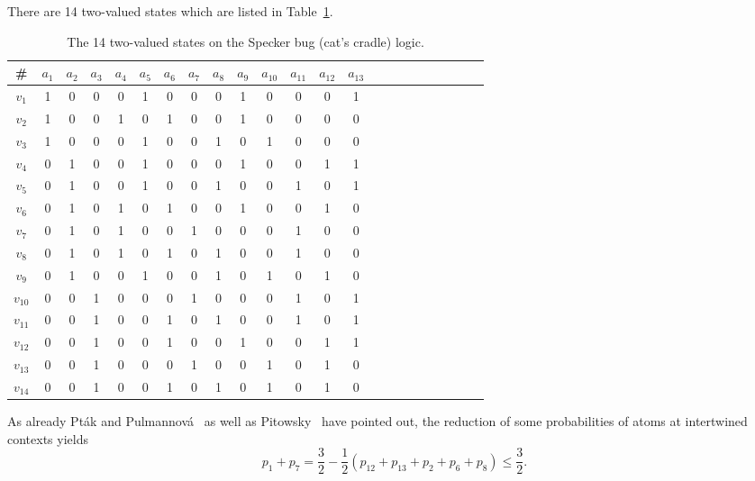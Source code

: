 There are 14 two-valued  states which are listed in Table~\ref{2001-cesena-t2}.
 \begin{table}%
 \begin{center}
\caption{\label{2001-cesena-t2}  The 14 two-valued states on the Specker bug (cat's cradle) logic.}
 \begin{tabular}{ccccccccccccccccccccccc}
\hline\hline
\# &$a_1$&$a_2$&$a_3$&$a_4$&$a_5$&$a_6$&$a_7$&$a_8$&$a_9$&$a_{10}$&$a_{11}$&$a_{12}$&$a_{13}$\\
\hline
$v_1 $&1&0&0&0&1&0&0&0&1&0&0&0&1         \\
$v_2 $&1&0&0&1&0&1&0&0&1&0&0&0&0          \\
$v_3 $&1&0&0&0&1&0&0&1&0&1&0&0&0         \\
$v_4 $&0&1&0&0&1&0&0&0&1&0&0&1&1         \\
$v_5 $&0&1&0&0&1&0&0&1&0&0&1&0&1         \\
$v_6 $&0&1&0&1&0&1&0&0&1&0&0&1&0          \\
$v_7 $&0&1&0&1&0&0&1&0&0&0&1&0&0          \\
$v_8 $&0&1&0&1&0&1&0&1&0&0&1&0&0          \\
$v_9 $&0&1&0&0&1&0&0&1&0&1&0&1&0         \\
$v_{10}$&0&0&1&0&0&0&1&0&0&0&1&0&1         \\
$v_{11}$&0&0&1&0&0&1&0&1&0&0&1&0&1         \\
$v_{12}$&0&0&1&0&0&1&0&0&1&0&0&1&1         \\
$v_{13}$&0&0&1&0&0&0&1&0&0&1&0&1&0         \\
$v_{14}$&0&0&1&0&0&1&0&1&0&1&0&1&0         \\
\hline\hline
 \end{tabular}
 \end{center}
 \end{table}

As already Pt{\'{a}}k and Pulmannov{\'{a}}~\cite[p.~39, Fig.~2.4.6]{pulmannova-91}
as well as
Pitowsky~\cite{Pitowsky2003395,pitowsky-06} have pointed out,
the reduction of some probabilities of atoms at intertwined contexts yields~\cite[p.~285, Eq.~(11.2)]{svozil-2016-s}
\begin{equation}
p_1+p_7=\frac{3}{2}- \frac{1}{2}\left(p_{12}+p_{13}+p_2+p_6+p_8\right)\le \frac{3}{2}
.
\label{2015-s-e2}
\end{equation}

